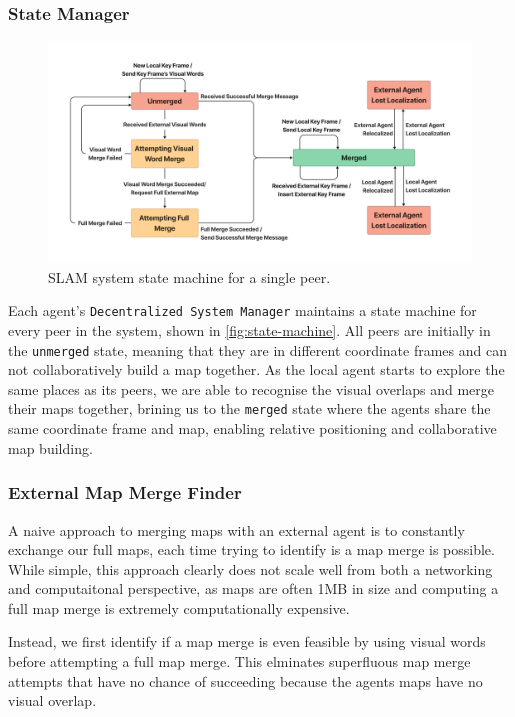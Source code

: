 \subsubsection{State Manager}
\label{sec:state-manager}

\begin{figure}[h]
    \centering
    \includegraphics[trim=5cm 5cm 5cm 5cm, scale=0.2]{figures/slam_system_state_machine.pdf}
    \caption{SLAM system state machine for a single peer.}
    \label{fig:state-machine}
\end{figure}

Each agent's \texttt{Decentralized System Manager} maintains a state machine for every peer in the system, shown in \autoref{fig:state-machine}. All peers are initially in the \texttt{unmerged} state, meaning that they are in different coordinate frames and can not collaboratively build a map together. As the local agent starts to explore the same places as its peers, we are able to recognise the visual overlaps and merge their maps together, brining us to the \texttt{merged} state where the agents share the same coordinate frame and map, enabling relative positioning and collaborative map building.

\subsubsection{External Map Merge Finder}
\label{sec:external-map-merge-finder}
A naive approach to merging maps with an external agent is to constantly exchange our full maps, each time trying to identify is a map merge is possible. While simple, this approach clearly does not scale well from both a networking and computaitonal perspective, as maps are often \>1MB in size and computing a full map merge is extremely computationally expensive.

Instead, we first identify if a map merge is even feasible by using visual words before attempting a full map merge. This elminates superfluous map merge attempts that have no chance of succeeding because the agents maps have no visual overlap.

